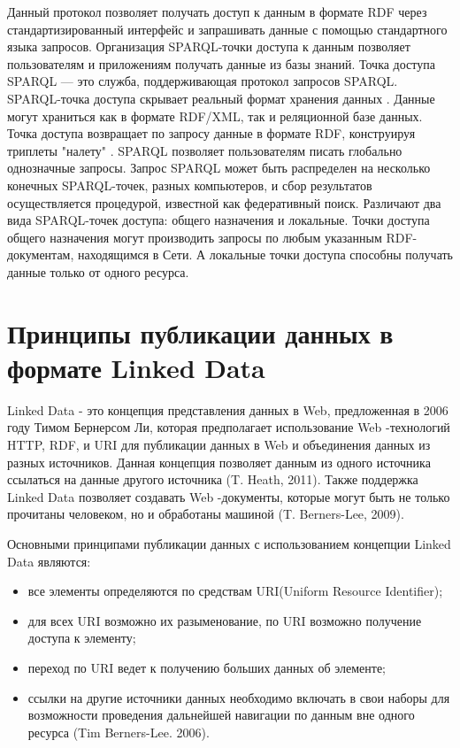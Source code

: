 Данный протокол позволяет получать доступ к данным в формате RDF через стандартизированный интерфейс и запрашивать данные с помощью стандартного языка запросов. Организация SPARQL-точки доступа к данным позволяет пользователям и приложениям получать данные из базы знаний. Точка доступа SPARQL — это служба, поддерживающая протокол запросов SPARQL. SPARQL-точка доступа скрывает реальный формат хранения данных \cite{perez2009semantics}. Данные могут храниться как в формате RDF/XML, так и реляционной базе данных. Точка доступа возвращает по запросу данные в формате RDF, конструируя триплеты "налету" \cite{quilitz2008querying}. SPARQL позволяет пользователям писать глобально однозначные запросы. Запрос SPARQL может быть распределен на несколько конечных SPARQL-точек, разных компьютеров, и сбор результатов осуществляется процедурой, известной как федеративный поиск. Различают два вида SPARQL-точек доступа: общего назначения и локальные. Точки доступа общего назначения могут производить запросы по любым указанным RDF-документам, находящимся в Сети. А локальные точки доступа способны получать данные только от одного ресурса.



\section{Принципы публикации данных в формате Linked Data} \label{sect1_5}


Linked Data - это концепция представления данных в Web, предложенная в 2006 году Тимом Бернерсом Ли, которая предполагает использование Web -технологий HTTP, RDF, и URI для публикации данных в Web и объединения данных из разных источников. Данная концепция позволяет данным из одного источника ссылаться на данные другого источника (T. Heath, 2011). Также поддержка Linked Data позволяет создавать Web -документы, которые могут быть не только прочитаны человеком, но и обработаны машиной (T. Berners-Lee, 2009). 

Основными принципами публикации данных с использованием концепции Linked Data являются:

\begin{itemize}
\item все элементы определяются по средствам  URI(Uniform Resource Identifier);
\item для всех URI возможно их разыменование,  по URI возможно получение доступа к элементу;
\item переход по URI ведет к получению больших данных об элементе;
\item ссылки на другие источники данных необходимо включать в свои наборы для возможности проведения дальнейшей навигации по данным вне одного ресурса (Tim Berners-Lee. 2006). 
\end{itemize}

